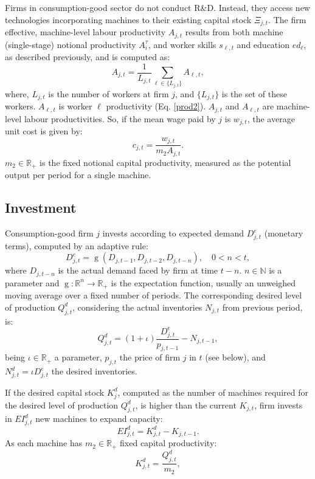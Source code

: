 \documentclass[a4paper,11pt]{article}
\begin{document}
\begin{appendices}
Firms in consumption-good sector do not conduct R\&D. Instead, they access new technologies incorporating machines to their existing capital stock $\Xi_{j,t}$. The firm effective, machine-level labour productivity $A_{j,t}$ results from both machine (single-stage) notional productivity $A_i^\tau$, and worker skills $s_{\ell,t}$ and education $ed_\ell$, as described previously, and is computed as:
\begin{equation}
	A_{j,t} = \frac{1}{L_{j,t}} \sum_{\ell \in \{L_{j,t}\}} A_{\ell,t},
\end{equation}
where, $L_{j,t}$ is the number of workers at firm $j$, and $\{L_{j,t}\}$ is the set of these workers. $A_{\ell,t}$ is worker $\ell$ productivity (Eq. \ref{prod2}). $A_{j,t}$ and $A_{\ell,t}$ are machine-level labour productivities. So, if the mean wage paid by $j$ is $w_{j,t}$, the average unit cost is given by:
\begin{equation}
	c_{j,t} = \frac{ w_{j,t} }{ m_2 A_{j,t} }.
\end{equation}
$m_2 \in \mathbb{R}_+$ is the fixed notional capital productivity, measured as the potential output per period for a single machine.


\subsection*{Investment}

Consumption-good firm $j$ invests according to expected demand $D^e_{j,t}$ (monetary terms), computed by an adaptive rule:
\begin{equation}
	D^e_{j,t} = \operatorname{g}\left( D_{j,t-1}, D_{j,t-2}, D_{j,t-n} \right), \quad 0 < n < t,
\end{equation}
where $D_{j,t-n}$ is the actual demand faced by firm at time $t-n$. $n \in \mathbb{N}$ is a parameter and $\operatorname{g}:\mathbb{R}^n \to \mathbb{R}_+$ is the expectation function, usually an unweighed moving average over a fixed number of periods. The corresponding desired level of production $Q^d_{j,t}$, considering the actual inventories $N_{j,t}$ from previous period, is:
\begin{equation}
	Q^d_{j,t} = ( 1 + \iota ) \frac{ D^e_{j,t} }{ p_{j,t-1} } - N_{j,t-1},
\end{equation}
being $\iota \in \mathbb{R}_+$ a parameter, $p_{j,t}$ the price of firm $j$ in $t$ (see below), and $N^d_{j,t}=\iota D^e_{j,t}$ the desired inventories.

If the desired capital stock $K^d_j$, computed as the number of machines required for the desired level of production $Q_{j,t}^d$, is higher than the current $K_{j,t}$, firm invests in ${EI}^d_{j,t}$ new machines to expand capacity:
\begin{equation}
	{EI}^d_{j,t} = K^d_{j,t} - K_{j,t-1}.
	\label{exp}
\end{equation}
As each machine has $m_2 \in \mathbb{R}_+$ fixed capital productivity:
\begin{equation}
	K^d_{j,t} = \frac{ Q^d_{j,t} }{ m_2 },
\end{equation}


\end{appendices}
\end{document}
